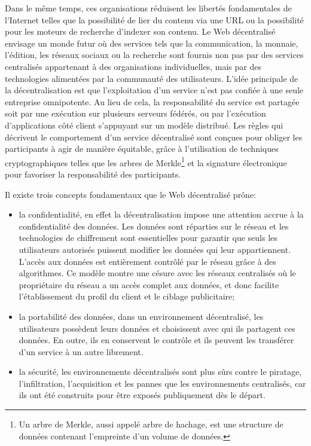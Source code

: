 \documentclass{tnreport}
\begin{document}
Dans le même temps, ces organisations réduisent les libertés fondamentales de l'Internet telles que la possibilité de lier du contenu via une URL ou la possibilité pour les moteurs de recherche d'indexer son contenu.
Le Web décentralisé envisage un monde futur où des services tels que la communication, la monnaie, l'édition, les réseaux sociaux ou la recherche sont fournis non pas par des services centralisés appartenant à des organisations individuelles, mais par des technologies alimentées par la communauté des utilisateurs.
L'idée principale de la décentralisation est que l'exploitation d'un service n'est pas confiée à une seule entreprise omnipotente. Au lieu de cela, la responsabilité du service est partagée soit par une exécution sur plusieurs serveurs fédérés, ou par l'exécution d'applications côté client s'appuyant sur un modèle distribué.
Les règles qui décrivent le comportement d'un service décentralisé sont conçues pour obliger les participants à agir de manière équitable, grâce à l'utilisation de techniques cryptographiques telles que les arbres de Merkle\footnote{Un arbre de Merkle, aussi appelé arbre de hachage, est une structure de données contenant l'empreinte d'un volume de données.} et la signature électronique pour favoriser la responsabilité des participants.

Il existe trois concepts fondamentaux que le Web décentralisé prône:
\begin{itemize}
	\item la confidentialité, en effet la décentralisation impose une attention accrue à la confidentialité des données. Les données sont réparties sur le réseau et les technologies de chiffrement sont essentielles pour garantir que seuls les utilisateurs autorisés puissent modifier les données qui leur appartiennent. L'accès aux données est entièrement contrôlé par le réseau grâce à des algorithmes. Ce modèle montre une césure avec les réseaux centralisés où le propriétaire du réseau a un accès complet aux données, et donc facilite l'établissement du profil du client et le ciblage publicitaire;
	\item la portabilité des données, dans un environnement décentralisé, les utilisateurs possèdent leurs données et choisissent avec qui ils partagent ces données. En outre, ils en conservent le contrôle et ils peuvent les transférer d'un service à un autre librement.
	\item la sécurité, les environnements décentralisés sont plus sûrs contre le piratage, l'infiltration, l'acquisition et les pannes que les environnements centralisés, car ils ont été construits pour être exposés publiquement dès le départ.
	\newline
\end{itemize}
\end{document}
